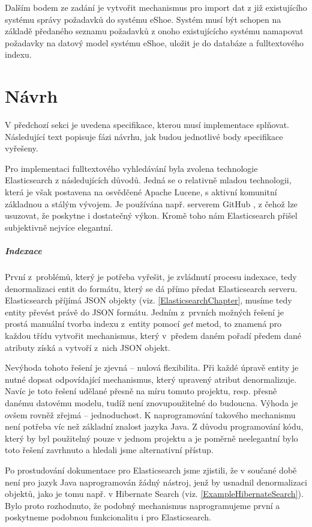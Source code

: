 \documentclass[11pt,oneside]{fithesis2}
\begin{document}
Dalším bodem ze zadání je vytvořit mechanismus pro import dat z již existujícího systému správy požadavků do systému eShoe. Systém musí být schopen na základě předaného seznamu požadavků z onoho existujícícho systému namapovat požadavky na datový model systému eShoe, uložit je do databáze a fulltextového indexu.

\section{Návrh}
V předchozí sekci je uvedena specifikace, kterou musí implementace splňovat. Následující text popisuje fázi návrhu, jak budou jednotlivé body specifikace vyřešeny. 

Pro implementaci fulltextového vyhledávání byla zvolena technologie Elasticsearch z následujících důvodů. Jedná se o relativně mladou technologii, která je však postavena na osvědčené Apache Lucene, s aktivní komunitní základnou a stálým vývojem. Je používána např. serverem GitHub \cite{ElasticsearchDefinitiveGuide}, z čehož lze usuzovat, že poskytne i dostatečný výkon. Kromě toho nám Elasticsearch přišel subjektivně nejvíce elegantní.

\subparagraph{Indexace}
První z~problémů, který je potřeba vyřešit, je zvládnutí procesu indexace, tedy denormalizaci entit do formátu, který se dá přímo předat Elasticsearch serveru. Elasticsearch příjímá JSON objekty (viz. \ref{ElasticsearchChapter}, musíme tedy entity převést právě do JSON formátu. Jedním z~prvních možných řešení je prostá manuální tvorba indexu z~entity pomocí \emph{get} metod, to znamená pro každou třídu vytvořit mechanismus, který v~předem daném pořadí předem dané atributy získá a vytvoří z~nich JSON objekt.

Nevýhoda tohoto řešení je zjevná -- nulová flexibilita. Při každé úpravě entity je nutné dopsat odpovídající mechanismus, který upravený atribut denormalizuje. Navíc je toto řešení udělané přesně na míru tomuto projektu, resp. přesně danému datovému modelu, tudíž není znovupoužitelné do budoucna. Výhoda je ovšem rovněž zřejmá -- jednoduchost. K naprogramování takového mechanismu není potřeba víc než základní znalost jazyka Java. Z důvodu programování kódu, který by byl použitelný pouze v jednom projektu a je poměrně neelegantní bylo toto řešení zavrhnuto a hledali jsme alternativní přístup.

Po prostudování dokumentace pro Elasticsearch jsme zjistili, že v součané době není pro jazyk Java naprogramován žádný nástroj, jenž by usnadnil denormalizaci objektů, jako je tomu např. v Hibernate Search (viz. \ref{ExampleHibernateSearch}). Bylo proto rozhodnuto, že podobný mechanismus naprogramujeme první a poskytneme podobnou funkcionalitu i pro Elasticsearch.
\end{document}
